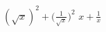 {$\displaystyle (\sqrt{x})^2 + \Bigg(\frac{1}{\sqrt{x}} \Bigg)^2$}
{$\displaystyle x + \frac{1}{x}$}
